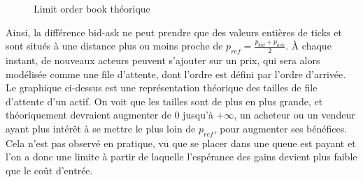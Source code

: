 \documentclass[12pt,a4paper]{article}
\theoremstyle{definition}
\theoremstyle{remark}
\begin{document}
    \begin{figure}[h!]
        \centering
        \caption{Limit order book théorique}
    \end{figure}
Ainsi, la différence bid-ask ne peut prendre que des valeurs entières de ticks et sont situés à une distance plus ou moins proche de $p_{ref} = \frac{p_{bid}+p_{ask}}{2}$. À chaque instant, de nouveaux acteurs peuvent s'ajouter sur un prix, qui sera alors modélisée comme une file d'attente, dont l'ordre est défini par l'ordre d'arrivée. Le graphique ci-dessus est une représentation  théorique des tailles de file d'attente d'un actif. On voit que les tailles sont de plus en plus grande, et théoriquement devraient augmenter de 0 jusqu'à $+\infty$, un acheteur ou un vendeur ayant plus intérêt à se mettre le plus loin de $p_{ref}$, pour augmenter ses bénéfices. Cela n'est pas observé en pratique, vu que se placer dans une queue est payant et l'on a donc une limite à partir de laquelle l'espérance des gains devient plus faible que le coût d'entrée.
\end{document}
